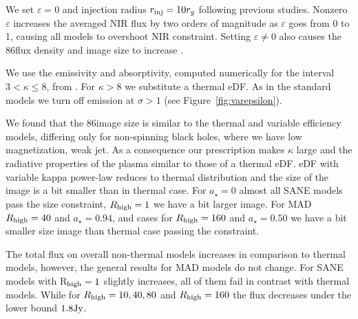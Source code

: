 We set $\varepsilon=0$ and injection radius $r_{\rm inj}=10r_{g}$ following previous studies.  Nonzero $\varepsilon$ increases the averaged NIR flux by two orders of magnitude as $\varepsilon$ goes from 0 to 1, causing all models to overshoot NIR constraint.  Setting $\varepsilon \ne 0$ also causes the 86\GHz flux density and image size to increase \citep{2021arXiv211102518F}.

We use the emissivity and absorptivity, computed numerically for the interval $3 < \kappa \le 8$, from  \cite{2016ApJ...822...34P}. For $\kappa > 8$ we substitute a thermal eDF.  As in the standard models we turn off emission at $\sigma > 1$ (see Figure~\ref{fig:varepsilon}).




We found that the 86\GHz image size is similar to the thermal and variable efficiency models, differing only for non-spinning black holes, where we have low magnetization, weak jet. As a consequence our prescription makes $\kappa$ large and the radiative properties of the plasma similar to those of a thermal eDF.
eDF with variable kappa power-law reduces to thermal distribution and the size of the image is a bit smaller than in thermal case. For $a_{\star}=0$ almost all SANE models pass the size constraint, $R_{\rm high}=1$ we have a bit larger image. For MAD $R_{\rm high}=40$ and $a_{\star}=0.94$, and cases for $R_{\rm high}=160$ and $a_{\star}=0.50$ we have a bit smaller size image than thermal case passing the constraint.


The total flux on overall non-thermal models increases in comparison to thermal models, however, the general results for MAD models do not change. For SANE models with R$_{\rm high}=1$ slightly increases, all of them fail in contrast with thermal models. While for $R_{\rm high}=10,40,80$ and $R_{\rm high}=160$ the flux decreases under the lower bound $1.8 \rm {Jy}$.


